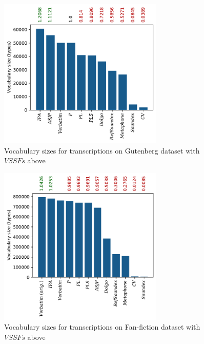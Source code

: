 \begin{figure}
  \centering
  \includegraphics[width=0.7\textwidth]{figures/vocab_sizes_2021-07-28_14-42-08_gb_pt}
  \caption{Vocabulary sizes for transcriptions on Gutenberg dataset with $VSSFs$ above}
  \label{fig:vssf_transcriptions_gb}
\end{figure}
\begin{figure}
  \centering
  \includegraphics[width=0.7\textwidth]{figures/vocab_sizes_2021-07-27_16-57-38_ff_pt}
  \caption{Vocabulary sizes for transcriptions on Fan-fiction dataset with $VSSFs$ above}
  \label{fig:vssf_transcriptions_ff}
\end{figure}

